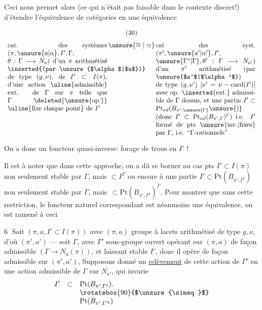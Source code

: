 Ceci nous permet alors (ce qui n'était pas faisable dans le contexte
discret!) d'étendre l'équivalence de catégories en une équivalence

\[
\begin{gathered}(30)\\[3pt]
\begin{array}{c@{\,}c@{\,}c}
\parbox[t]{0.44\linewidth}{%
cat. des systèmes $(\pi,\unsure{a|\alpha},I',\allowbreak\Gamma,\allowbreak\theta:\Gamma\longrightarrow N_a)$
d'un $\pi$ arithmétisé \inserted{(par \unsure{$\alpha$|$a$})} de type $(g,\nu)$,
de $I'\subset I(\pi)$, d'une action
\uline{admissible} ext. de $\Gamma$ sur $\pi$
telle que $\Gamma$ \deleted{\unsure{op.}} \uline{fixe chaque point} de $I'$
}
& \unsure{\cong|\simeq} &
\parbox[t]{0.44\linewidth}{%
cat des syst.
$(\pi',\unsure{a'|\alpha'},I',\allowbreak\unsure{\Gamma^{*}|\Gamma},\allowbreak\theta':\Gamma\longrightarrow N_{a'})$
d'un $\pi'$ arithmétisé (par \unsure{$a'$|$\alpha'$}) de type
$(g,\nu')$ $[\nu'=\nu-\mathrm{card}(I')]$
avec op. \inserted{ext.} admissible de $\Gamma$ dessus, et
une partie $I'\subset\mathrm{Pt}_{ad}(B_{\pi',\unsure{\Gamma}}\unsure{)}$
(donc $I'\subset\mathrm{Pt}_{ad}(B_{\pi',\Gamma})^\Gamma$)
i.e. $I'$ formé de pts \unsure{inv.|fixes} par $\Gamma$, i.e. ``$\Gamma$-rationnels''
}
\end{array}
\end{gathered}\]


On a donc un foncteur quasi-inverse:
forage de trous en $I'$ !


Il est à noter que dans cette approche, on a dû se borner au cas
  pts 
$I'\subset I(\pi)$ non seulement stable par $\Gamma$, mais
 $\subset I^\Gamma$
 ou encore à une partie
$I'\subset\mathrm{Pt}(B_{\pi',\Gamma^{\natural}})$
non seulement stable par $\Gamma$, mais
\,$\subset\mathrm{Pt}(B_{\pi',\Gamma^{\natural}})^\Gamma$.
Pour montrer que sans cette restriction, le foncteur naturel
 correspondant est néanmoins
une équivalence, on est ramené à ceci

\textcircled{6} Soit $(\pi,a,I'\subset I(\pi))$ avec $(\pi,a)$
groupe à lacets   arithmétisé de type
$g,\nu$, d'où $(\pi',a')$ --- soit $\Gamma$, avec $\Gamma'$
sous-groupe ouvert opérant sur $(\pi,a)$ de façon admissible
$(\Gamma\longrightarrow N_a(\pi))$,
et laissant stable $I'$, donc il opère de façon admissible sur
$(\pi',a')$,
Supposons donné un \uline{relèvement} de cette action de $\Gamma'$
en une action admissible de $\Gamma$ sur $N_{a'}$, qui invarie
\[
\begin{array}{rcl}
I'&\subset&\mathrm{Pt}(B_{\pi',\Gamma^{\natural}}).\\
&&\rotatebox{90}{$\unsure{\simeq}$}\\
&&\mathrm{Pt}(B_{\pi',\Gamma^{\prime\natural}})
\end{array}
\]

